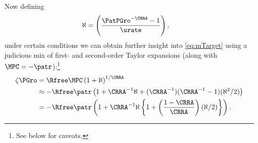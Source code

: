 \documentclass{handout}
\begin{document}
Now defining
\begin{equation}\begin{gathered}\begin{aligned}
  \aleph & =  \left(\frac{\PatPGro^{-\CRRA} - 1}{\urate}\right),
\end{aligned}\end{gathered}\end{equation}
under certain conditions we can obtain further insight into \eqref{eq:mTarget} using a judicious mix of first- and second-order Taylor expansions (along with $\MPCU = -\patr$):\footnote{See below for caveats.}
\begin{equation}\begin{gathered}\begin{aligned}
  \label{eq:zetaExp}
  \zeta\PGro & =  \Rfree \MPCU \left(1+\aleph\right)^{1/\CRRA}
\\ & \approx  -\Rfree \patr \left(1+\CRRA^{-1}\aleph+(\CRRA^{-1})(\CRRA^{-1}-1)(\aleph^{2}/2)\right)
\\ & =  -\Rfree \patr \left(1+\CRRA^{-1}\aleph\left\{1+\left(\frac{1-\CRRA}{\CRRA}\right)(\aleph/2)\right\}\right) %
.
\end{aligned}\end{gathered}\end{equation}
\end{document}
